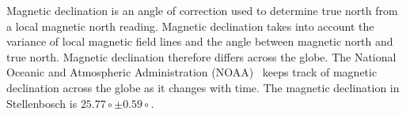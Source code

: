 Magnetic declination is an angle of correction used to determine true north from a local magnetic north reading. Magnetic declination takes into account the variance of local magnetic 
field lines and the angle between magnetic north and true north. Magnetic declination therefore differs across the globe. The National Oceanic and Atmospheric Administration (NOAA) \
keeps track of magnetic declination across the globe as it changes with time. The magnetic declination in Stellenbosch is $25.77\circ \pm 0.59\circ$.   